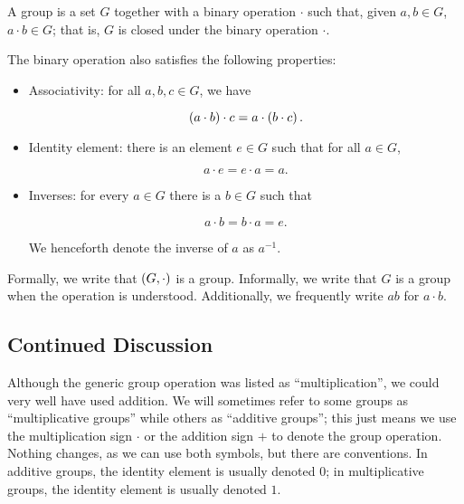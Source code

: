 \begin{defn}[Group]
A \gls{group} is a \gls{set} $G$ together with a binary operation $\cdot$
such that, given $a,b\in G$, $a\cdot b\in G$;
that is, $G$ is closed under the binary operation $\cdot$.

The binary operation also satisfies the following properties:

\begin{itemize}
\item Associativity: for all $a,b,c\in G$, we have

\begin{equation}
    \left( a\cdot b \right)\cdot c = a\cdot \left( b\cdot c \right).
\end{equation}

\item Identity element: there is an element $e\in G$ such that
    for all $a\in G$,

\begin{equation}
    a\cdot e = e\cdot a = a.
\end{equation}

\item Inverses: for every $a\in G$ there is a $b\in G$ such that
    
\begin{equation}
    a\cdot b = b\cdot a = e.
\end{equation}

\noindent
We henceforth denote the inverse of $a$ as $a^{-1}$.
\end{itemize}
\end{defn}

Formally, we write that $\left( G,\cdot \right)$ is a \gls{group}.
Informally, we write that $G$ is a \gls{group} when the operation is understood.
Additionally, we frequently write $ab$ for $a\cdot b$.

\subsection{Continued Discussion}
Although the generic group operation was listed as ``multiplication'',
we could very well have used addition.
We will sometimes refer to some \glspl{group} as ``multiplicative groups''
while others as ``additive groups'';
this just means we use the multiplication sign $\cdot$
or the addition sign $+$ to denote the group operation.
Nothing changes, as we can use both symbols,
but there are conventions.
In additive groups, the identity element is usually denoted $0$;
in multiplicative groups, the identity element is usually denoted $1$.

